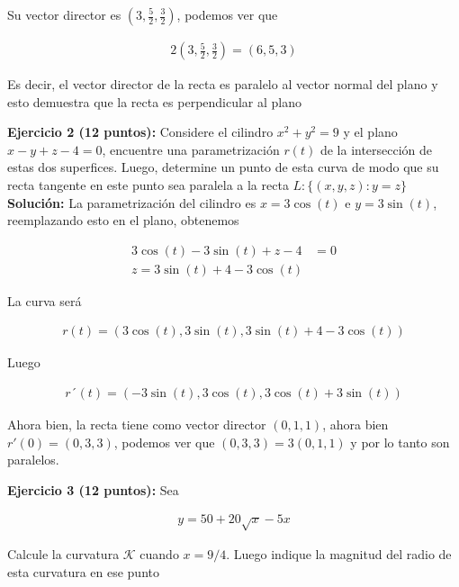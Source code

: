 \documentclass[a4paper]{article}
\begin{document}
Su vector director es $\displaystyle \left( 3, \frac{5}{2}, \frac{3}{2}\right)$, podemos ver que

\begin{align*}
    2\left( 3, \frac{5}{2}, \frac{3}{2}\right) = (6,5,3)
\end{align*}

Es decir, el vector director de la recta es paralelo al vector normal del plano y esto demuestra que la recta es perpendicular al plano





\newpage

\textbf{Ejercicio 2 \textbf{(12 puntos)}:} Considere el cilindro $x^2+y^2=9$ y el plano $x-y+z-4=0$, encuentre una parametrización $r(t)$ de la intersección de estas dos superfices. Luego, determine un punto de esta curva de modo que su recta tangente en este punto sea paralela a la recta $L: \lbrace (x,y,z): y=z \rbrace$ \\


\textbf{Solución: }La parametrización del cilindro es $x=3\cos(t)$ e $y=3\sin(t)$, reemplazando esto en el plano, obtenemos

\begin{align*}
    3\cos(t)-3\sin(t)+z-4 &=0 \\
    z=3\sin(t)+4-3\cos(t)
\end{align*}

La curva será

\begin{align*}
    r(t) = (3\cos(t), 3\sin(t), 3\sin(t)+4-3\cos(t)) 
\end{align*}

Luego

\begin{align*}
    r´(t) = (-3\sin(t), 3\cos(t), 3\cos(t)+3\sin(t)) 
\end{align*}

Ahora bien, la recta tiene como vector director $(0,1,1)$, ahora bien $r'\left( 0\right) = (0,3,3)$, podemos ver que $(0,3,3)=3(0,1,1)$ y por lo tanto son paralelos.






\newpage


\textbf{Ejercicio 3 \textbf{(12 puntos)}:} Sea

\begin{align*}
    y=50+20\sqrt{x}-5x
\end{align*}

Calcule la curvatura $\mathcal{K}$ cuando $x=9/4$. Luego indique la magnitud del radio de esta curvatura en ese punto \\
\end{document}
